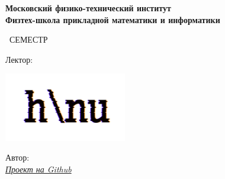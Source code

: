 \begin{titlepage}
	\clearpage\thispagestyle{empty}
	\centering
	
	\textbf{Московский физико-технический институт \\ Физтех-школа прикладной математики и информатики}
	\vspace{33ex}
	
	{\textbf{\FullCourseNameFirstPart}}
	
	\SemesterNumber\ СЕМЕСТР
	\vspace{1ex}
	
	Лектор: \textit{\LecturerInitials}
	
	\includegraphics[width=0.4\textwidth]{image/logo_ltc.png}

	\begin{flushright}
		\noindent
		Автор: \href{\VKLink}{\textit{\AuthorInitials}}
		\\
		\href{\GithubLink}{\textit{Проект на Github}}
	\end{flushright}
	
	\vfill
	\CourseDate
	\pagebreak
\end{titlepage}
